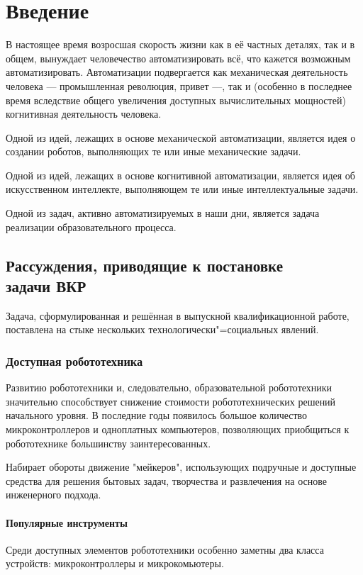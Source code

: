 \chapter{Введение}

В настоящее время возросшая скорость жизни как в её частных деталях, так и в общем, вынуждает человечество автоматизировать всё, что кажется возможным автоматизировать. Автоматизации подвергается как механическая деятельность человека --- промышленная революция, привет ---, так и (особенно в последнее время вследствие общего увеличения доступных вычислительных мощностей) когнитивная деятельность человека.

Одной из идей, лежащих в основе механической автоматизации, является идея о создании роботов, выполняющих те или иные механические задачи.

Одной из идей, лежащих в основе когнитивной автоматизации, является идея об искусственном интеллекте, выполняющем те или иные интеллектуальные задачи.

Одной из задач, активно автоматизируемых в наши дни, является задача реализации образовательного процесса.

\section{Рассуждения, приводящие к постановке\\ задачи ВКР}
Задача, сформулированная и решённая в выпускной квалификационной работе, поставлена на стыке нескольких технологически"=социальных явлений.

\subsection{Доступная робототехника}
Развитию робототехники и, следовательно, образовательной робототехники значительно способствует снижение стоимости робототехнических решений начального уровня. В последние годы появилось большое количество микроконтроллеров и одноплатных компьютеров, позволяющих приобщиться к робототехнике большинству заинтересованных.

Набирает обороты движение "мейкеров", использующих подручные и доступные средства для решения бытовых задач, творчества и развлечения на основе инженерного подхода.

\subsubsection{Популярные инструменты}
Среди доступных элементов робототехники особенно заметны два класса устройств: микроконтроллеры и микрокомьютеры.

